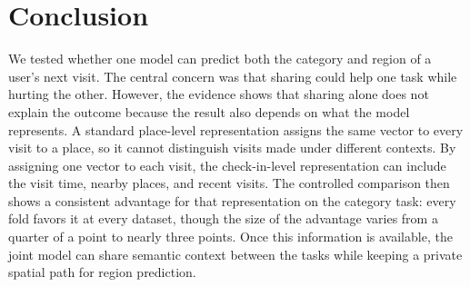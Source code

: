 \section{Conclusion}
\label{sec:mobiwac:conclusion}

We tested whether one model can predict both the category and region of a user's next visit. The central concern was
that sharing could help one task while hurting the other. However, the evidence shows that sharing alone does not
explain the outcome because the result also depends on what the model represents. A standard place-level representation
assigns the same vector to every visit to a place, so it cannot distinguish visits made under different contexts. By
assigning one vector to each visit, the check-in-level representation can include the visit time, nearby places, and
recent visits. The controlled comparison then shows a consistent advantage for that representation on the category
task: every fold favors it at every dataset, though the size of the advantage varies from a quarter of a point to
nearly three points. Once this information is available, the joint model can share
semantic context between the tasks while keeping a private spatial path for region prediction.

